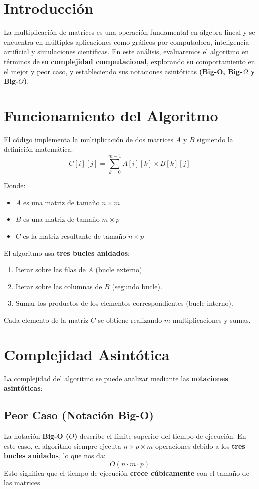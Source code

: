 \documentclass{article}
\begin{document}
	\newpage
	
	
	\section{Introducción}
	La multiplicación de matrices es una operación fundamental en álgebra lineal y se encuentra en múltiples aplicaciones como gráficos por computadora, inteligencia artificial y simulaciones científicas. En este análisis, evaluaremos el algoritmo en términos de su \textbf{complejidad computacional}, explorando su comportamiento en el mejor y peor caso, y estableciendo sus notaciones asintóticas \textbf{(Big-O, Big-\(\Omega\) y Big-\(\Theta\))}.
	
	\section{Funcionamiento del Algoritmo}
	El código implementa la multiplicación de dos matrices \( A \) y \( B \) siguiendo la definición matemática:
	\[
	C[i][j] = \sum_{k=0}^{m-1} A[i][k] \times B[k][j]
	\]
	
	Donde:
	\begin{itemize}
		\item \( A \) es una matriz de tamaño \( n \times m \)
		\item \( B \) es una matriz de tamaño \( m \times p \)
		\item \( C \) es la matriz resultante de tamaño \( n \times p \)
	\end{itemize}
	
	El algoritmo usa \textbf{tres bucles anidados}:
	\begin{enumerate}
		\item Iterar sobre las filas de \( A \) (bucle externo).
		\item Iterar sobre las columnas de \( B \) (segundo bucle).
		\item Sumar los productos de los elementos correspondientes (bucle interno).
	\end{enumerate}
	Cada elemento de la matriz \( C \) se obtiene realizando \( m \) multiplicaciones y sumas.
	
	\section{Complejidad Asintótica}
	La complejidad del algoritmo se puede analizar mediante las \textbf{notaciones asintóticas}:
	
	\subsection*{Peor Caso (Notación Big-O)}
	La notación \textbf{Big-O (\(O\))} describe el límite superior del tiempo de ejecución. En este caso, el algoritmo siempre ejecuta \( n \times p \times m \) operaciones debido a los \textbf{tres bucles anidados}, lo que nos da:
	\[
	O(n \cdot m \cdot p)
	\]
	Esto significa que el tiempo de ejecución \textbf{crece cúbicamente} con el tamaño de las matrices.
	
\end{document}
